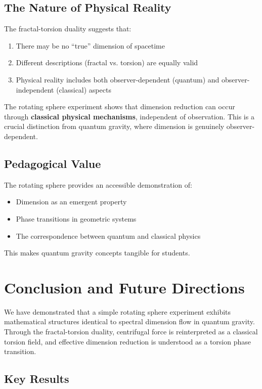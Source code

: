 \documentclass[12pt,a4paper]{article}
\begin{document}
\subsection{The Nature of Physical Reality}

The fractal-torsion duality suggests that:
\begin{enumerate}
    \item There may be no ``true'' dimension of spacetime
    \item Different descriptions (fractal vs. torsion) are equally valid
    \item Physical reality includes both observer-dependent (quantum) and observer-independent (classical) aspects
\end{enumerate}

The rotating sphere experiment shows that dimension reduction can occur through \textbf{classical physical mechanisms}, independent of observation. This is a crucial distinction from quantum gravity, where dimension is genuinely observer-dependent.

\subsection{Pedagogical Value}

The rotating sphere provides an accessible demonstration of:
\begin{itemize}
    \item Dimension as an emergent property
    \item Phase transitions in geometric systems
    \item The correspondence between quantum and classical physics
\end{itemize}

This makes quantum gravity concepts tangible for students.

\section{Conclusion and Future Directions}
\label{sec:conclusion}

We have demonstrated that a simple rotating sphere experiment exhibits mathematical structures identical to spectral dimension flow in quantum gravity. Through the fractal-torsion duality, centrifugal force is reinterpreted as a classical torsion field, and effective dimension reduction is understood as a torsion phase transition.

\subsection{Key Results}
\end{document}
